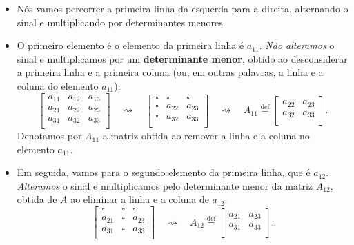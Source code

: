 \documentclass[../livro.tex]{subfiles}  %
\begin{document}
\begin{itemize}
\item Nós vamos percorrer a primeira linha da esquerda para a direita, alternando o sinal e multiplicando por determinantes menores.
\item O primeiro elemento é o elemento da primeira linha é $a_{11}$. \textit{Não alteramos} o sinal e multiplicamos por um \textbf{determinante menor}, obtido ao desconsiderar a primeira linha e a primeira coluna (ou, em outras palavras, a linha e a coluna do elemento $a_{11}$):
\begin{equation}
\begin{bmatrix}
a_{11} & a_{12} & a_{13} \\
a_{21} & a_{22} & a_{23} \\
a_{31} & a_{32} & a_{33} \\
\end{bmatrix} \quad \rightsquigarrow \quad 
\begin{bmatrix}
\square & \square & \square \\
\square & a_{22}  & a_{23} \\
\square & a_{32}  & a_{33} \\
\end{bmatrix} \quad \rightsquigarrow \quad A_{11} \stackrel{\text{def}}{=} 
\begin{bmatrix}
a_{22}  & a_{23} \\
a_{32}  & a_{33} \\
\end{bmatrix}.
\end{equation} Denotamos por $A_{11}$ a matriz obtida ao remover a linha e a coluna no elemento $a_{11}$.
\item Em seguida, vamos para o segundo elemento da primeira linha, que é $a_{12}$. \textit{Alteramos} o sinal e multiplicamos pelo determinante menor da matriz $A_{12}$, obtida de $A$ ao eliminar a linha e a coluna de $a_{12}$:
\begin{equation}
\begin{bmatrix}
\square & \square & \square \\
a_{21}  & \square & a_{23} \\
a_{31}  & \square & a_{33} \\
\end{bmatrix} \quad \rightsquigarrow \quad A_{12} \stackrel{\text{def}}{=} 
\begin{bmatrix}
a_{21}  & a_{23} \\
a_{31}  & a_{33} \\
\end{bmatrix}.

\end{equation}
\end{itemize}
\end{document}
